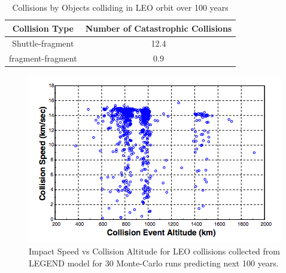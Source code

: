 \documentclass[pre,12pt]{revtex4-1}
\begin{document}
\begin{table}[htb]
\centering
    \begin{tabular}{| c | c |} \hline
    \textbf{Collision Type} & \textbf{Number of Catastrophic Collisions} \\ \hline
    Shuttle-fragment & 12.4\\ \hline
    fragment-fragment & 0.9\\ \hline
    \end{tabular}
\caption{Collisions by Objects colliding in LEO orbit over 100 years}
\label{table:CollisionAlt}
\end{table}


\begin{figure}[h!]
	\includegraphics[width=.5\textwidth]{"Figures/CollisionAlt"}
	\caption{Impact Speed vs Collision Altitude for LEO collisions collected from LEGEND model for 30 Monte-Carlo runs predicting next 100 years\citep{CollisionProbs}.}
	\label{fig:CollisionAlt}
\end{figure}
\end{document}
